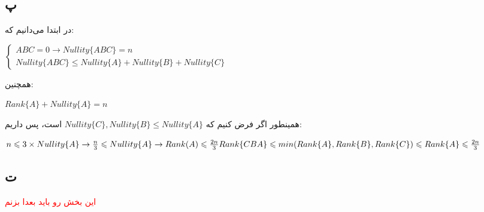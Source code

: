 \subsection*{پ}
در ابتدا می‌دانیم که:

\setLTR

$
\begin{cases}
	ABC = 0 \rightarrow Nullity\{ABC\} = n \\ 
	Nullity\{ABC\} \leq Nullity\{A\} + Nullity\{B\} + Nullity\{C\}
\end{cases}
$
\setRTL

همچنین:
\setLTR

$
Rank\{A\} + Nullity\{A\} = n 
$
\setRTL

همینطور اگر فرض کنیم که
 $Nullity\{C\} , Nullity\{B\} \leq Nullity\{A\}$
است، پس داریم:

\setLTR

$
n \leq 3 \times Nullity\{A\} \rightarrow \frac{n}{3} \leq Nullity\{A\} \rightarrow 
Rank(A) \leq \frac{2n}{3} \\ 
Rank\{CBA\} \leq min(Rank\{A\},Rank\{B\},Rank\{C\}) \leq Rank\{A\} \leq \frac{2n}{3}
$

\setRTL

\subsection*{ت}

\textcolor{red}{
این بخش رو باید بعدا بزنم
}